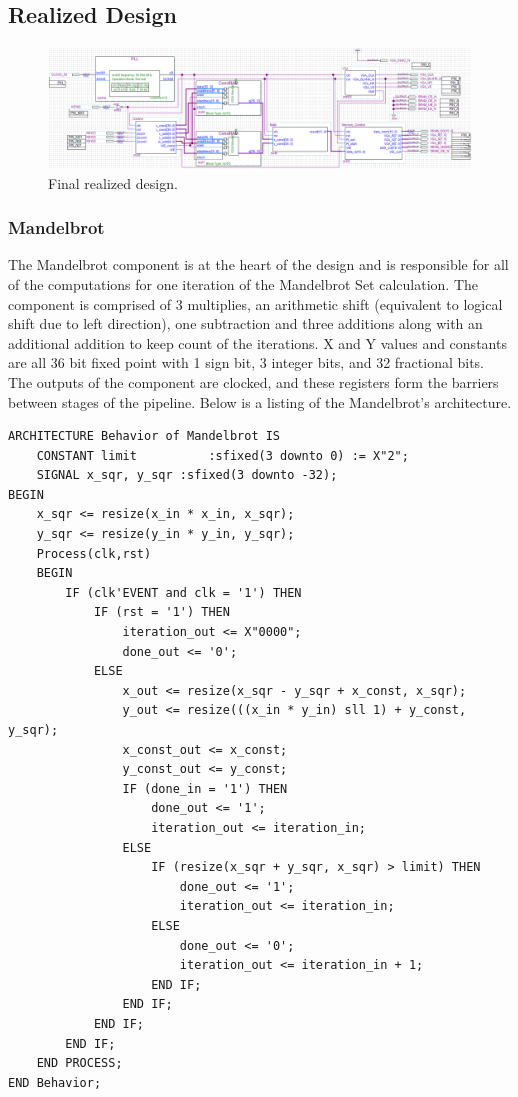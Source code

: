 \documentclass[titlepage]{article}      %
\begin{document}
\subsection{Realized Design}
\begin{figure}[H]
\centering
\includegraphics[width=6in]{FinalDiagram}
\caption{Final realized design.}
\end{figure}
\subsubsection{Mandelbrot}
The Mandelbrot component is at the heart of the design and is responsible for all of the computations for one iteration of the Mandelbrot Set calculation. The component is comprised of 3 multiplies, an arithmetic shift (equivalent to logical shift due to left direction), one subtraction and three additions along with an additional addition to keep count of the iterations. X and Y values and constants are all 36 bit fixed point with 1 sign bit, 3 integer bits, and 32 fractional bits. The outputs of the component are clocked, and these registers form the barriers between stages of the pipeline. Below is a listing of the Mandelbrot's architecture.
\begin{lstlisting}
ARCHITECTURE Behavior of Mandelbrot IS
	CONSTANT limit			:sfixed(3 downto 0) := X"2";
	SIGNAL x_sqr, y_sqr	:sfixed(3 downto -32);
BEGIN
	x_sqr <= resize(x_in * x_in, x_sqr);
	y_sqr <= resize(y_in * y_in, y_sqr);
	Process(clk,rst)
	BEGIN
		IF (clk'EVENT and clk = '1') THEN
			IF (rst = '1') THEN
				iteration_out <= X"0000";
				done_out <= '0';
			ELSE
				x_out <= resize(x_sqr - y_sqr + x_const, x_sqr);
				y_out <= resize(((x_in * y_in) sll 1) + y_const, y_sqr);
				x_const_out <= x_const;
				y_const_out <= y_const;
				IF (done_in = '1') THEN
					done_out <= '1';
					iteration_out <= iteration_in;
				ELSE
					IF (resize(x_sqr + y_sqr, x_sqr) > limit) THEN
						done_out <= '1';
						iteration_out <= iteration_in;
					ELSE
						done_out <= '0';
						iteration_out <= iteration_in + 1;
					END IF;
				END IF;
			END IF;
		END IF;
	END PROCESS;
END Behavior;
\end{lstlisting}
\end{document}
